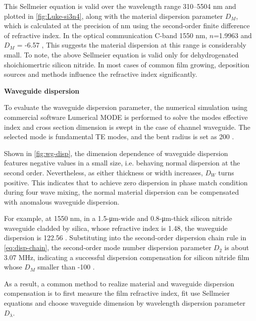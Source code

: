This Sellmeier equation is valid over the wavelength range 310–5504 \si{\nm} and plotted in \autoref{fig:Luke-si3n4}, along with the material dispersion parameter $D_M$, which is calculated at the precision of \si{\nm} using the second-order finite difference of refractive index. In the optical communication C-band 1550 nm, $n$=1.9963 and $D_M$ = -6.57 \dispu, This suggests the material dispersion at this range is considerably small. To note, the above Sellmeier equation is valid only for dehydrogenated shoichiomertric silicon nitride. In most cases of common film growing, deposition sources and methods influence the refractive index significantly.

\begin{figure}
    \centering
    
    \label{fig:Luke-si3n4}
\end{figure}

\bigskip
\noindent\textbf{Waveguide dispersion}

To evaluate the waveguide dispersion parameter, the numerical simulation using commercial software {Lumerical MODE} is performed to solve the modes effective index and cross section dimension is swept in the case of channel waveguide. The selected mode is fundamental TE modes, and the bent radius is set as 200 \um.

Shown in \autoref{fig:wg-disp}, the dimension dependence of waveguide dispersion features negative values in a small size, i.e. behaving normal dispersion at the second order. Nevertheless, as either thickness or width increases,
$D_W$ turns positive. This indicates that to achieve zero dispersion in phase match condition during four wave mixing, the normal material dispersion can be compensated with anomalous waveguide dispersion. 

For example, at 1550 \si{\nm}, in a 1.5-\si{\um}-wide and 0.8-\si{\um}-thick silicon nitride waveguide cladded by silica, whose refractive index is 1.48,
the waveguide dispersion is 122.56 \dispu. Substituting into the second-order dispersion chain rule in \autoref{eq:disp-chain}, the second-order mode number dispersion parameter $ D_2 $ is about 3.07 MHz, indicating a successful dispersion compensation for silicon nitride film whose $D_M$ smaller than -100 \dispu.

As a result, a common method to realize material and waveguide dispersion compensation is to first measure the film refractive index, fit use Sellmeier equations and choose waveguide dimension by wavelength dispersion parameter $ D_{\lambda} $.

